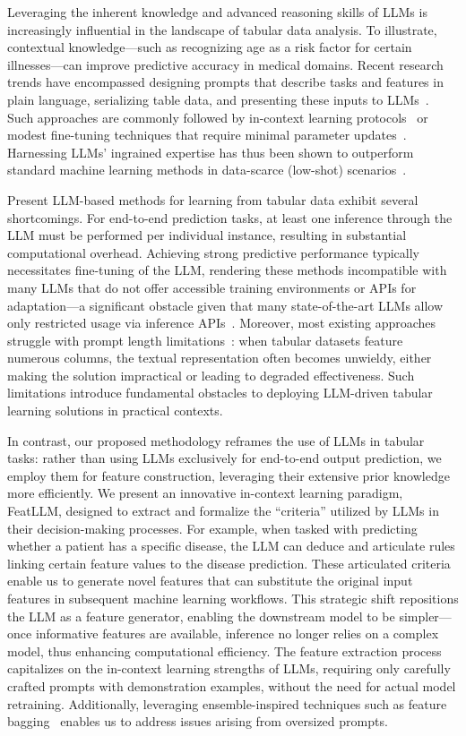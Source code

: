 Leveraging the inherent knowledge and advanced reasoning skills of LLMs is increasingly influential in the landscape of tabular data analysis. To illustrate, contextual knowledge—such as recognizing age as a risk factor for certain illnesses—can improve predictive accuracy in medical domains. Recent research trends have encompassed designing prompts that describe tasks and features in plain language, serializing table data, and presenting these inputs to LLMs~\cite{dinh2022lift,wang2023anypredict}. Such approaches are commonly followed by in-context learning protocols~\cite{nam2023semi} or modest fine-tuning techniques that require minimal parameter updates~\cite{dinh2022lift,hegselmann2023tabllm}. Harnessing LLMs' ingrained expertise has thus been shown to outperform standard machine learning methods in data-scarce (low-shot) scenarios~\cite{hegselmann2023tabllm}.

Present LLM-based methods for learning from tabular data exhibit several shortcomings. For end-to-end prediction tasks, at least one inference through the LLM must be performed per individual instance, resulting in substantial computational overhead. Achieving strong predictive performance typically necessitates fine-tuning of the LLM, rendering these methods incompatible with many LLMs that do not offer accessible training environments or APIs for adaptation—a significant obstacle given that many state-of-the-art LLMs allow only restricted usage via inference APIs~\cite{anil2023palm,openai2023gpt4}. Moreover, most existing approaches struggle with prompt length limitations~\cite{liu2023lost}: when tabular datasets feature numerous columns, the textual representation often becomes unwieldy, either making the solution impractical or leading to degraded effectiveness. Such limitations introduce fundamental obstacles to deploying LLM-driven tabular learning solutions in practical contexts.

In contrast, our proposed methodology reframes the use of LLMs in tabular tasks: rather than using LLMs exclusively for end-to-end output prediction, we employ them for feature construction, leveraging their extensive prior knowledge more efficiently. We present an innovative in-context learning paradigm, \textsf{FeatLLM}, designed to extract and formalize the “criteria” utilized by LLMs in their decision-making processes. For example, when tasked with predicting whether a patient has a specific disease, the LLM can deduce and articulate rules linking certain feature values to the disease prediction. These articulated criteria enable us to generate novel features that can substitute the original input features in subsequent machine learning workflows. This strategic shift repositions the LLM as a feature generator, enabling the downstream model to be simpler—once informative features are available, inference no longer relies on a complex model, thus enhancing computational efficiency. The feature extraction process capitalizes on the in-context learning strengths of LLMs, requiring only carefully crafted prompts with demonstration examples, without the need for actual model retraining. Additionally, leveraging ensemble-inspired techniques such as feature bagging~\cite{breiman2001random} enables us to address issues arising from oversized prompts.

